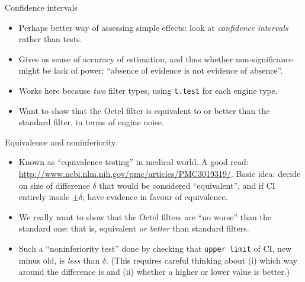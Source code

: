 \begin{frame}[fragile]{Confidence intervals}
  
  \begin{itemize}
  \item Perhaps better way of assessing simple effects: look at
    \emph{confidence intervals} rather than tests.
  \item Gives us sense of accuracy of estimation, and thus whether
    non-significance might be lack of power: ``absence of evidence is
    not evidence of absence''.
  \item Works here because \emph{two} filter types, using
    \texttt{t.test} for each engine type.
  \item Want to show that the Octel filter is equivalent to or better
    than the standard filter, in terms of engine noise.
  \end{itemize}
  
\end{frame}

\begin{frame}[fragile]{Equivalence and noninferiority}
  
  \begin{itemize}
  \item Known as ``equivalence testing'' in medical world. A good
    read:
    \url{http://www.ncbi.nlm.nih.gov/pmc/articles/PMC3019319/}. Basic
    idea: decide on size of difference $\delta$ that would be considered
    ``equivalent'', and if CI entirely inside $\pm \delta$, have
    evidence in favour of equivalence.
  \item We really want to show that the Octel filters are ``no worse''
    than the standard one: that is, equivalent \emph{or better} than
    standard filters.
  \item Such a ``noninferiority test'' done by checking that
    \texttt{upper limit} of CI, new minus old, is \emph{less} than
    $\delta$. (This requires careful thinking about (i) which way
    around the difference is and (ii) whether a higher or lower value
    is better.)
  \end{itemize}
  
\end{frame}


